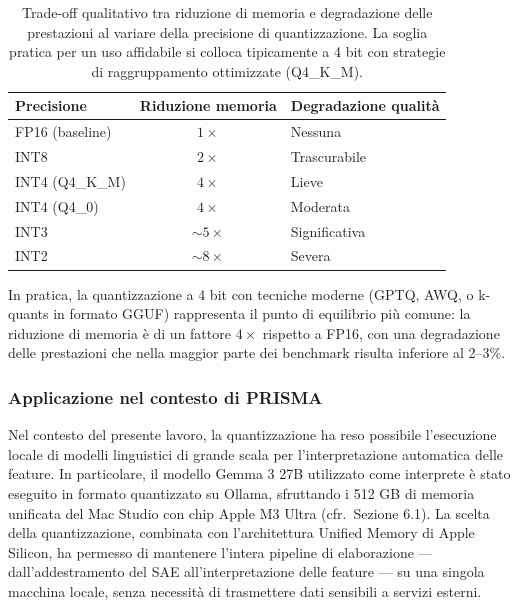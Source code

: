 \begin{table}[h]
\centering
\begin{tabular}{lcl}
\toprule
\textbf{Precisione} & \textbf{Riduzione memoria} & \textbf{Degradazione qualità} \\
\midrule
FP16 (baseline) & $1\times$ & Nessuna \\
INT8 & $2\times$ & Trascurabile \\
INT4 (Q4\_K\_M) & $4\times$ & Lieve \\
INT4 (Q4\_0) & $4\times$ & Moderata \\
INT3 & $\sim 5\times$ & Significativa \\
INT2 & $\sim 8\times$ & Severa \\
\bottomrule
\end{tabular}
\caption{Trade-off qualitativo tra riduzione di memoria e degradazione delle prestazioni al variare della precisione di quantizzazione. La soglia pratica per un uso affidabile si colloca tipicamente a 4 bit con strategie di raggruppamento ottimizzate (Q4\_K\_M).}
\label{tab:quant_tradeoff}
\end{table}

In pratica, la quantizzazione a 4 bit con tecniche moderne (GPTQ, AWQ, o k-quants in formato GGUF) rappresenta il punto di equilibrio più comune: la riduzione di memoria è di un fattore $4\times$ rispetto a FP16, con una degradazione delle prestazioni che nella maggior parte dei benchmark risulta inferiore al 2--3\%.

\subsubsection{Applicazione nel contesto di PRISMA}

Nel contesto del presente lavoro, la quantizzazione ha reso possibile l'esecuzione locale di modelli linguistici di grande scala per l'interpretazione automatica delle feature. In particolare, il modello Gemma 3 27B utilizzato come interprete è stato eseguito in formato quantizzato su Ollama, sfruttando i 512 GB di memoria unificata del Mac Studio con chip Apple M3 Ultra (cfr.\ Sezione 6.1). La scelta della quantizzazione, combinata con l'architettura Unified Memory di Apple Silicon, ha permesso di mantenere l'intera pipeline di elaborazione --- dall'addestramento del SAE all'interpretazione delle feature --- su una singola macchina locale, senza necessità di trasmettere dati sensibili a servizi esterni.